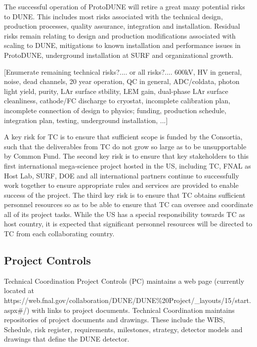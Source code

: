 The successful operation of ProtoDUNE will retire a great many
potential risks to DUNE. This includes most risks associated with the
technical design, production processes, quality assurance, integration
and installation. Residual risks remain relating to design and
production modifications associated with scaling to DUNE, mitigations
to known installation and performance issues in ProtoDUNE, underground
installation at SURF and organizational growth.

[Enumerate remaining technical risks?.... or all risks?.... 600kV, HV
  in general, noise, dead channels, 20 year operation, QC in general,
  ADC/coldata, photon light yield, purity, LAr surface stbility, LEM
  gain, dual-phase LAr surface cleanliness, cathode/FC discharge to
  cryostat, incomplete calibration plan, incomplete connection of
  design to physics; funding, production schedule, integration plan,
  testing, underground installation, ...]

A key risk for TC is to ensure that sufficient scope is funded by the
Consortia, such that the deliverables from TC do not grow so large as
to be unsupportable by Common Fund. The second key risk is to ensure
that key stakeholders to this first international mega-science project
hosted in the US, including TC, FNAL as Host Lab, SURF, DOE and all
international partners continue to successfully work together to
ensure appropriate rules and services are provided to enable success
of the project.  The third key risk is to ensure that TC obtains
sufficient personnel resources so as to be able to ensure that TC can
oversee and coordinate all of its project tasks.  While the US has a
special responsibility towards TC as host country, it is expected that
significant personnel resources will be directed to TC from each
collaborating country.



\subsection{Project Controls}
\label{sec:fdsp-coord-controls}

Technical Coordination Project Controls (PC) maintains a web page
(currently located at
{https://web.fnal.gov/collaboration/DUNE/DUNE\%20Project/\_layouts/15/start.aspx\#/})
with links to project documents. Technical Coordination maintains
repositories of project documents and drawings. These include the WBS,
Schedule, risk register, requirements, milestones, strategy, detector
models and drawings that define the DUNE detector.

